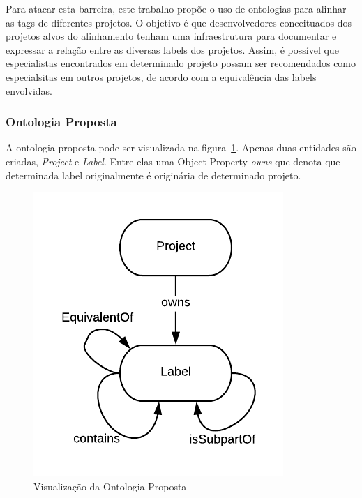 \documentclass[sigconf]{acmart}
\begin{document}
Para atacar esta barreira, este trabalho propõe o uso de ontologias para alinhar as tags de diferentes projetos. O objetivo é que desenvolvedores conceituados dos projetos alvos do alinhamento tenham uma infraestrutura para documentar e expressar a relação entre as diversas labels dos projetos. Assim, é possível que especialistas encontrados em determinado projeto possam ser recomendados como especialsitas em outros projetos, de acordo com a equivalência das labels envolvidas.

\subsubsection{Ontologia Proposta}

A ontologia proposta pode ser visualizada na figura~\ref{fig:ontologia}. Apenas duas entidades são criadas, \textit{Project} e \textit{Label}. Entre elas uma Object Property \textit{owns} que denota que determinada label originalmente é originária de determinado projeto.

\begin{figure}[!htbp]
\centering
 \includegraphics[width=\columnwidth]{ontologia}
 \caption{Visualização da Ontologia Proposta}\label{fig:ontologia}
\end{figure}
\end{document}
